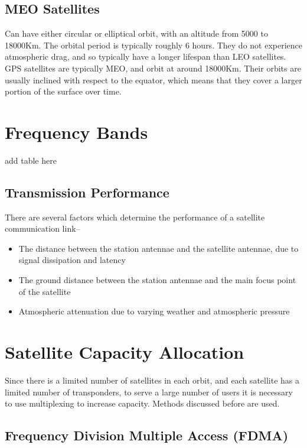 \subsection*{MEO Satellites}

Can have either circular or elliptical orbit, with an altitude from 5000 to 18000Km. The orbital period is typically
 roughly 6 hours. They do not experience atmospheric drag, and so typically have a longer lifespan than LEO satellites.
 GPS satellites are typically MEO, and orbit at around 18000Km. Their orbits are usually inclined with respect to the
 equator, which means that they cover a larger portion of the surface over time.

\section*{Frequency Bands}

{\Huge add table here}

\subsection*{Transmission Performance}

There are several factors which determine the performance of a satellite communication link--
\begin{itemize}
  \item The distance between the station antennae and the satellite antennae, due to signal dissipation and latency
  \item The ground distance between the station antennae and the main focus point of the satellite
  \item Atmospheric attenuation due to varying weather and atmospheric pressure
\end{itemize}

\section*{Satellite Capacity Allocation}

Since there is a limited number of satellites in each orbit, and each satellite has a limited number of transponders,
 to serve a large number of users it is necessary to use multiplexing to increase capacity. Methods discussed before
 are used.

\subsection*{Frequency Division Multiple Access (FDMA)}

